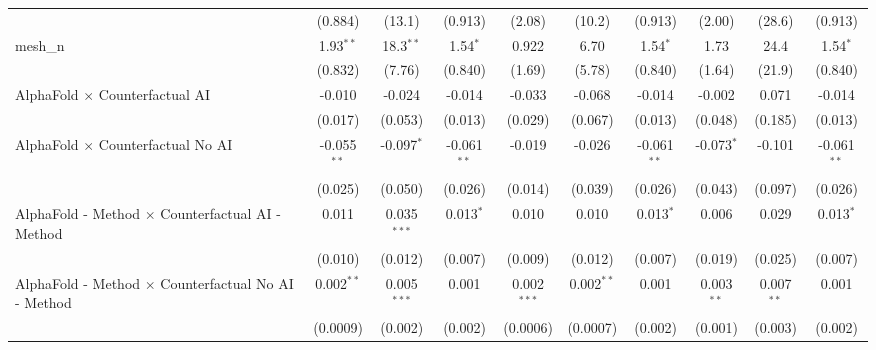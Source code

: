 \begin{tabular}{lccccccccc}
                                                               & (0.884)        & (13.1)         & (0.913)        & (2.08)         & (10.2)        & (0.913)        & (2.00)         & (28.6)         & (0.913)\\   
   mesh\_n                                                     & 1.93$^{**}$    & 18.3$^{**}$    & 1.54$^{*}$     & 0.922          & 6.70          & 1.54$^{*}$     & 1.73           & 24.4           & 1.54$^{*}$\\   
                                                               & (0.832)        & (7.76)         & (0.840)        & (1.69)         & (5.78)        & (0.840)        & (1.64)         & (21.9)         & (0.840)\\   
   AlphaFold $\times$ Counterfactual AI                        & -0.010         & -0.024         & -0.014         & -0.033         & -0.068        & -0.014         & -0.002         & 0.071          & -0.014\\   
                                                               & (0.017)        & (0.053)        & (0.013)        & (0.029)        & (0.067)       & (0.013)        & (0.048)        & (0.185)        & (0.013)\\   
   AlphaFold $\times$ Counterfactual No AI                     & -0.055$^{**}$  & -0.097$^{*}$   & -0.061$^{**}$  & -0.019         & -0.026        & -0.061$^{**}$  & -0.073$^{*}$   & -0.101         & -0.061$^{**}$\\   
                                                               & (0.025)        & (0.050)        & (0.026)        & (0.014)        & (0.039)       & (0.026)        & (0.043)        & (0.097)        & (0.026)\\   
   AlphaFold - Method $\times$ Counterfactual AI - Method      & 0.011          & 0.035$^{***}$  & 0.013$^{*}$    & 0.010          & 0.010         & 0.013$^{*}$    & 0.006          & 0.029          & 0.013$^{*}$\\   
                                                               & (0.010)        & (0.012)        & (0.007)        & (0.009)        & (0.012)       & (0.007)        & (0.019)        & (0.025)        & (0.007)\\   
   AlphaFold - Method $\times$ Counterfactual No AI - Method   & 0.002$^{**}$   & 0.005$^{***}$  & 0.001          & 0.002$^{***}$  & 0.002$^{**}$  & 0.001          & 0.003$^{**}$   & 0.007$^{**}$   & 0.001\\   
                                                               & (0.0009)       & (0.002)        & (0.002)        & (0.0006)       & (0.0007)      & (0.002)        & (0.001)        & (0.003)        & (0.002)\\   

\end{tabular}
